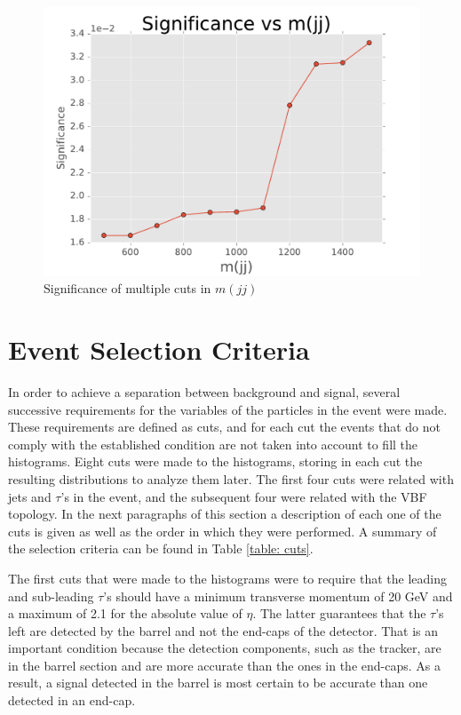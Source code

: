 \begin{figure}[H]
\centering
\includegraphics[width = \linewidth]{significance_mass}
\caption{Significance of multiple cuts in $m(jj)$}
\label{fig: significanceMass}
\end{figure}


\section{Event Selection Criteria}\label{sec: selectionCriteria}

In order to achieve a separation between background and signal, several successive requirements for the variables of the particles in the event were made. These requirements are defined as cuts, and for each cut the events that do not comply with the established condition are not taken into account to fill the histograms. Eight cuts were made to the histograms, storing in each cut the resulting distributions to analyze them later. The first four cuts were related with jets and $\tau$'s in the event, and the subsequent four were related with the VBF topology. In the next paragraphs of this section a description of each one of the cuts is given as well as the order in which they were performed. A summary of the selection criteria can be found in Table \ref{table: cuts}.

The first cuts that were made to the histograms were to require that the leading and sub-leading $\tau$'s should have a minimum transverse momentum of 20 GeV and a maximum of 2.1 for the absolute value of $\eta$. The latter guarantees that the $\tau$'s left are detected by the barrel and not the end-caps of the detector. That is an important condition because the detection components, such as the tracker, are in the barrel section and are more accurate than the ones in the end-caps. As a result, a signal detected in the barrel is most certain to be accurate than one detected in an end-cap.  

